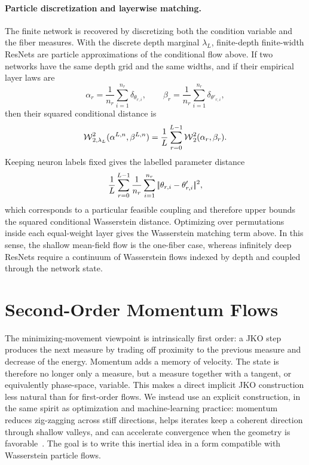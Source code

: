 \paragraph{Particle discretization and layerwise matching.}
The finite network is recovered by discretizing both the condition variable and the fiber measures. With the discrete depth marginal $\lambda_L$, finite-depth finite-width ResNets are particle approximations of the conditional flow above. If two networks have the same depth grid and the same widths, and if their empirical layer laws are
\[
	\alpha_r=\frac1{n_r}\sum_{i=1}^{n_r}\delta_{\theta_{r,i}},
	\qquad
	\beta_r=\frac1{n_r}\sum_{i=1}^{n_r}\delta_{\theta'_{r,i}},
\]
then their squared conditional distance is
\[
	\operatorname{\mathcal{W}}_{2,\lambda_L}^2(\alpha^{L,n},\beta^{L,n})
	=
	\frac1L\sum_{r=0}^{L-1} \operatorname{\mathcal{W}}_2^2(\alpha_r,\beta_r).
\]
Keeping neuron labels fixed gives the labelled parameter distance
\[
	\frac1L\sum_{r=0}^{L-1}\frac1{n_r}
	\sum_{i=1}^{n_r}|\!| \theta_{r,i}-\theta'_{r,i} |\!|^2,
\]
which corresponds to a particular feasible coupling and therefore upper bounds the squared conditional Wasserstein distance. Optimizing over permutations inside each equal-weight layer gives the Wasserstein matching term above. In this sense, the shallow mean-field flow is the one-fiber case, whereas infinitely deep ResNets require a continuum of Wasserstein flows indexed by depth and coupled through the network state.

\section{Second-Order Momentum Flows}
\label{sec-second-order-momentum-flows}

The minimizing-movement viewpoint is intrinsically first order: a JKO step produces the next measure by trading off proximity to the previous measure and decrease of the energy. Momentum adds a memory of velocity. The state is therefore no longer only a measure, but a measure together with a tangent, or equivalently phase-space, variable. This makes a direct implicit JKO construction less natural than for first-order flows. We instead use an explicit construction, in the same spirit as optimization and machine-learning practice: momentum reduces zig-zagging across stiff directions, helps iterates keep a coherent direction through shallow valleys, and can accelerate convergence when the geometry is favorable~\cite{Qian1999Momentum,Sutskever2013Momentum}. The goal is to write this inertial idea in a form compatible with Wasserstein particle flows.

